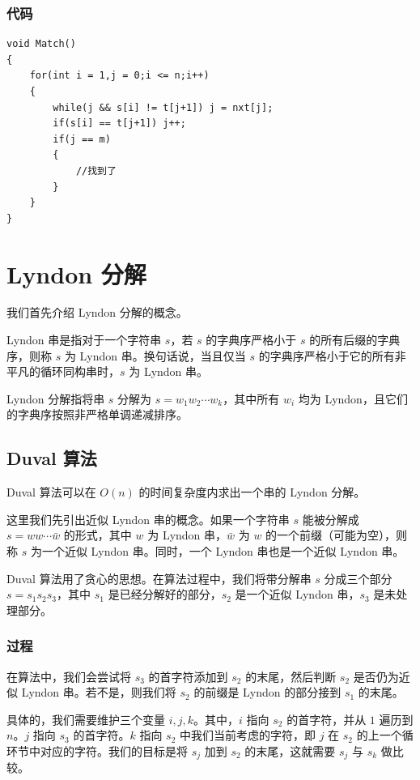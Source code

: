 \documentclass[10pt,twoside,a4paper,UTF8]{ctexbook}
\begin{document}
	\subsubsection{代码}
	\begin{lstlisting}
void Match()
{
    for(int i = 1,j = 0;i <= n;i++)
    {
        while(j && s[i] != t[j+1]) j = nxt[j];
        if(s[i] == t[j+1]) j++;
        if(j == m)
        {
            //找到了
        }
    }
}
	\end{lstlisting}
	\section{Lyndon 分解}
	我们首先介绍 Lyndon 分解的概念。
	
	Lyndon 串是指对于一个字符串 $s$，若 $s$ 的字典序严格小于 $s$ 的所有后缀的字典序，则称 $s$ 为 Lyndon 串。换句话说，当且仅当 $s$ 的字典序严格小于它的所有非平凡的循环同构串时，$s$ 为 Lyndon 串。
	
	Lyndon 分解指将串 $s$ 分解为 $s = w_1 w_2 \cdots w_k$，其中所有 $w_i$ 均为 Lyndon，且它们的字典序按照非严格单调递减排序。
	
	\subsection{Duval 算法}
	Duval 算法可以在 $O(n)$ 的时间复杂度内求出一个串的 Lyndon 分解。
	
	这里我们先引出近似 Lyndon 串的概念。如果一个字符串 $s$ 能被分解成 $s = ww\cdots\bar w$ 的形式，其中 $w$ 为 Lyndon 串，$\bar w$ 为 $w$ 的一个前缀（可能为空），则称 $s$ 为一个近似 Lyndon 串。同时，一个 Lyndon 串也是一个近似 Lyndon 串。
	
	Duval 算法用了贪心的思想。在算法过程中，我们将带分解串 $s$ 分成三个部分 $s=s_1s_2s_3$，其中 $s_1$ 是已经分解好的部分，$s_2$ 是一个近似 Lyndon 串，$s_3$ 是未处理部分。
	\subsubsection{过程}
	在算法中，我们会尝试将 $s_3$ 的首字符添加到 $s_2$ 的末尾，然后判断 $s_2$ 是否仍为近似 Lyndon 串。若不是，则我们将 $s_2$ 的前缀是 Lyndon 的部分接到 $s_1$ 的末尾。
	
	具体的，我们需要维护三个变量 $i, j, k$。其中，$i$ 指向 $s_2$ 的首字符，并从 $1$ 遍历到 $n$。$j$ 指向 $s_3$ 的首字符。$k$ 指向 $s_2$ 中我们当前考虑的字符，即 $j$ 在 $s_2$ 的上一个循环节中对应的字符。我们的目标是将 $s_j$ 加到 $s_2$ 的末尾，这就需要 $s_j$ 与 $s_k$ 做比较。
	
\end{document}
